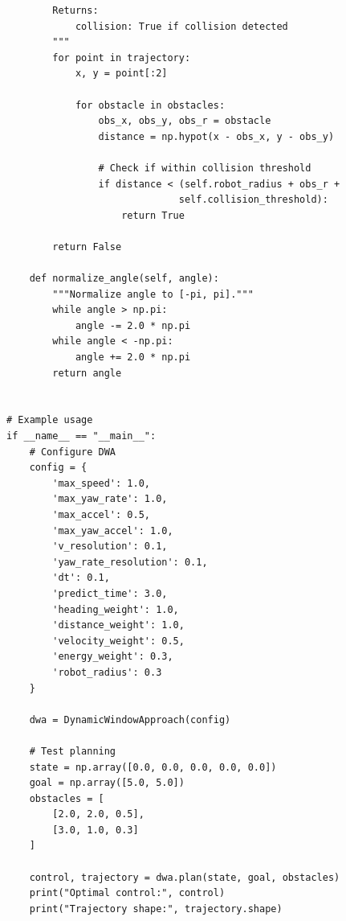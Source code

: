 \begin{lstlisting}
        Returns:
            collision: True if collision detected
        """
        for point in trajectory:
            x, y = point[:2]
            
            for obstacle in obstacles:
                obs_x, obs_y, obs_r = obstacle
                distance = np.hypot(x - obs_x, y - obs_y)
                
                # Check if within collision threshold
                if distance < (self.robot_radius + obs_r + 
                              self.collision_threshold):
                    return True
        
        return False
    
    def normalize_angle(self, angle):
        """Normalize angle to [-pi, pi]."""
        while angle > np.pi:
            angle -= 2.0 * np.pi
        while angle < -np.pi:
            angle += 2.0 * np.pi
        return angle


# Example usage
if __name__ == "__main__":
    # Configure DWA
    config = {
        'max_speed': 1.0,
        'max_yaw_rate': 1.0,
        'max_accel': 0.5,
        'max_yaw_accel': 1.0,
        'v_resolution': 0.1,
        'yaw_rate_resolution': 0.1,
        'dt': 0.1,
        'predict_time': 3.0,
        'heading_weight': 1.0,
        'distance_weight': 1.0,
        'velocity_weight': 0.5,
        'energy_weight': 0.3,
        'robot_radius': 0.3
    }
    
    dwa = DynamicWindowApproach(config)
    
    # Test planning
    state = np.array([0.0, 0.0, 0.0, 0.0, 0.0])
    goal = np.array([5.0, 5.0])
    obstacles = [
        [2.0, 2.0, 0.5],
        [3.0, 1.0, 0.3]
    ]
    
    control, trajectory = dwa.plan(state, goal, obstacles)
    print("Optimal control:", control)
    print("Trajectory shape:", trajectory.shape)
\end{lstlisting}

\clearpage
